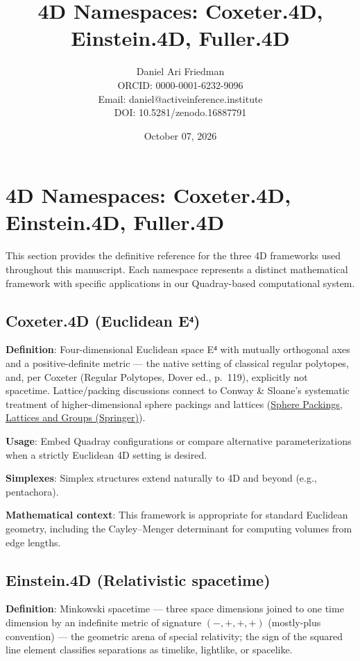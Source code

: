 \documentclass[
  10pt,
]{article}
\title{4D Namespaces: Coxeter.4D, Einstein.4D, Fuller.4D}
\author{Daniel Ari Friedman\\ ORCID: 0000-0001-6232-9096\\ Email: daniel@activeinference.institute\\ DOI: 10.5281/zenodo.16887791}
\date{October 07, 2026}
\begin{document}
\maketitle

{
\hypersetup{linkcolor=black}
\setcounter{tocdepth}{3}
\tableofcontents
}
\section{4D Namespaces: Coxeter.4D, Einstein.4D,
Fuller.4D}\label{d-namespaces-coxeter.4d-einstein.4d-fuller.4d}

This section provides the definitive reference for the three 4D
frameworks used throughout this manuscript. Each namespace represents a
distinct mathematical framework with specific applications in our
Quadray-based computational system.

\subsection{Coxeter.4D (Euclidean
E⁴)}\label{coxeter.4d-euclidean-eux2074}

\textbf{Definition}: Four-dimensional Euclidean space E⁴ with mutually
orthogonal axes and a positive-definite metric --- the native setting of
classical regular polytopes, and, per Coxeter (Regular Polytopes, Dover
ed., p.~119), explicitly not spacetime. Lattice/packing discussions
connect to Conway \& Sloane's systematic treatment of higher-dimensional
sphere packings and lattices
(\href{https://link.springer.com/book/10.1007/978-1-4757-6568-7}{Sphere
Packings, Lattices and Groups (Springer)}).

\textbf{Usage}: Embed Quadray configurations or compare alternative
parameterizations when a strictly Euclidean 4D setting is desired.

\textbf{Simplexes}: Simplex structures extend naturally to 4D and beyond
(e.g., pentachora).

\textbf{Mathematical context}: This framework is appropriate for
standard Euclidean geometry, including the Cayley--Menger determinant
for computing volumes from edge lengths.

\subsection{Einstein.4D (Relativistic
spacetime)}\label{einstein.4d-relativistic-spacetime}

\textbf{Definition}: Minkowski spacetime --- three space dimensions
joined to one time dimension by an indefinite metric of signature
\((-,+,+,+)\) (mostly-plus convention) --- the geometric arena of
special relativity; the sign of the squared line element classifies
separations as timelike, lightlike, or spacelike.
\end{document}
